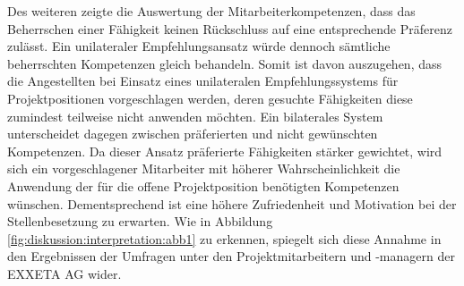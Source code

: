 Des weiteren zeigte die Auswertung der Mitarbeiterkompetenzen, dass das Beherrschen einer Fähigkeit keinen Rückschluss auf eine entsprechende Präferenz zulässt. Ein unilateraler Empfehlungsansatz würde dennoch sämtliche beherrschten Kompetenzen gleich behandeln. Somit ist davon auszugehen, dass die Angestellten bei Einsatz eines unilateralen Empfehlungssystems für Projektpositionen vorgeschlagen werden, deren gesuchte Fähigkeiten diese zumindest teilweise nicht anwenden möchten. Ein bilaterales System unterscheidet dagegen zwischen präferierten und nicht gewünschten Kompetenzen. Da dieser Ansatz präferierte Fähigkeiten stärker gewichtet, wird sich ein vorgeschlagener Mitarbeiter mit höherer Wahrscheinlichkeit die Anwendung der für die offene Projektposition benötigten Kompetenzen wünschen. Dementsprechend ist eine höhere Zufriedenheit und Motivation bei der Stellenbesetzung zu erwarten. Wie in Abbildung \ref{fig:diskussion:interpretation:abb1} zu erkennen, spiegelt sich diese Annahme in den Ergebnissen der Umfragen unter den Projektmitarbeitern und -managern der EXXETA AG wider.

